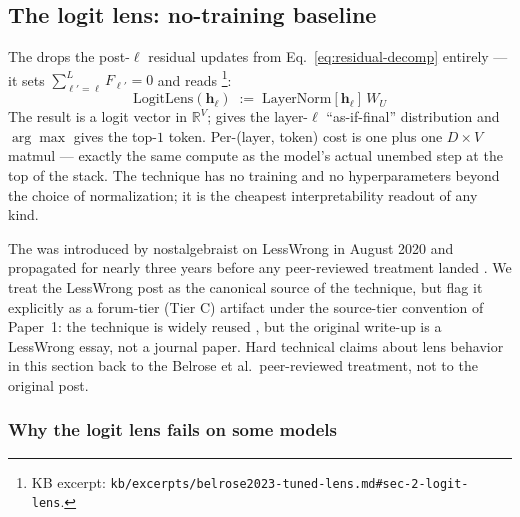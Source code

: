 \subsection{The logit lens: no-training baseline}
\label{sec:logit-lens}

The  drops the post-$\ell$ residual updates from
Eq.~\eqref{eq:residual-decomp} entirely — it sets
$\sum_{\ell'=\ell}^{L} F_{\ell'} = 0$ and reads
\citep[\S 2, Eq.~3]{belrose2023-tuned-lens}\footnote{KB excerpt:
\nolinkurl{kb/excerpts/belrose2023-tuned-lens.md#sec-2-logit-lens}.}:
\begin{equation}
  \boxed{\;\mathrm{LogitLens}(\mathbf{h}_\ell) \;:=\; \mathrm{LayerNorm}[\mathbf{h}_\ell]\,W_U\;}
  \label{eq:logit-lens}
\end{equation}
The result is a logit vector in $\mathbb{R}^V$;  gives the
layer-$\ell$ ``as-if-final'' distribution and $\arg\max$ gives the
top-$1$ token. Per-(layer, token) cost is one  plus one
$D \times V$ matmul — exactly the same compute as the model's actual
unembed step at the top of the stack. The technique has no training
 and no hyperparameters beyond the choice of normalization;
it is the cheapest interpretability readout of any kind.

\begin{forumsignal}
The  was introduced by nostalgebraist on LessWrong in August
2020 \citep{nostalgebraist2020-logit-lens} and propagated for nearly
three years before any peer-reviewed treatment landed
\citep[\S 2]{belrose2023-tuned-lens}. We treat the LessWrong post as the
canonical source of the technique, but flag it explicitly as a
forum-tier (Tier C) artifact under the source-tier convention of
Paper~1: the technique is widely reused
\citep[Halawi 2023, Geva 2022, Dar 2022 referenced in
][\S 2]{belrose2023-tuned-lens}, but the original write-up is a
LessWrong essay, not a journal paper. Hard technical claims about lens
behavior in this section back to the Belrose et al.\ peer-reviewed
treatment, not to the original post.
\end{forumsignal}

\subsubsection*{Why the logit lens fails on some models}

